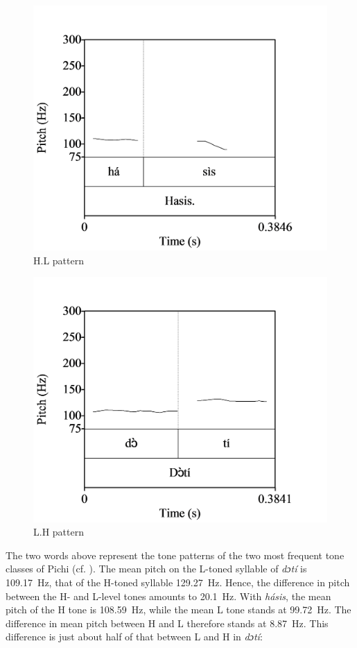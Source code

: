 \begin{figure}
\caption{H.L pattern}
\label{fig:key:3.5}
\includegraphics[height=.3\textheight]{figures/yakpomod-img7.png}
\end{figure}

\begin{figure}
\caption{L.H pattern}
\label{fig:key:3.6}  
\includegraphics[height=.3\textheight]{figures/yakpomod-img8.png}
\end{figure}

The two words above represent the tone patterns of the two most frequent tone classes of Pichi (cf. ). The mean pitch on the L-toned syllable of \textit{dɔtí} is 109.17~Hz, that of the H-toned syllable 129.27~Hz. Hence, the difference in pitch between the H- and L-level tones amounts to 20.1~Hz. With \textit{hásis}, the mean pitch of the H tone is 108.59~Hz, while the mean L tone stands at 99.72~Hz. The difference in mean pitch between H and L therefore stands at 8.87~Hz. This difference is just about half of that between L and H in \textit{dɔtí}:

